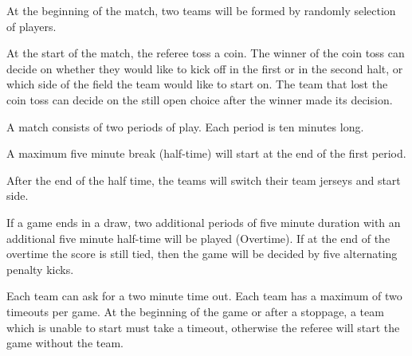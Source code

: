 \documentclass[12pt]{hurocup}
\begin{document}
\label{law:gameplay}

\begin{lawlist}[US]
\item At the beginning of the match, two teams will be formed by
  randomly selection of players.

\item At the start of the match, the referee toss a coin. The winner
  of the coin toss can decide on whether they would like to kick off
  in the first or in the second halt, or which side of the field the
  team would like to start on. The team that lost the coin toss can
  decide on the still open choice after the winner made its
  decision.
  
\item A match consists of two periods of play. Each period is ten
  minutes long.

\item A maximum five minute break (half-time) will start at the end of
  the first period.

\item After the end of the half time, the teams will switch their team jerseys
  and start side.

\item If a game ends in a draw, two additional periods of five minute
  duration with an additional five minute half-time will be played
  (Overtime). If at the end of the overtime the score is still tied,
  then the game will be decided by five alternating penalty kicks.

\item Each team can ask for a two minute time out. Each team has a
  maximum of two timeouts per game. At the beginning of the game or
  after a stoppage, a team which is unable to start must take a
  timeout, otherwise the referee will start the game without the team.

\end{lawlist}

\end{document}
